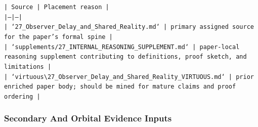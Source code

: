 \documentclass[11pt]{article}
\begin{document}
\noindent\texttt{| Source | Placement reason |}\\
\noindent\texttt{|---|---|}\\
\noindent\texttt{| `27\_Observer\_Delay\_and\_Shared\_Reality.md` | primary assigned source for the paper's formal spine |}\\
\noindent\texttt{| `supplements/27\_INTERNAL\_REASONING\_SUPPLEMENT.md` | paper-local reasoning supplement contributing to definitions, proof sketch, and limitations |}\\
\noindent\texttt{| `virtuous\textbackslash{}27\_Observer\_Delay\_and\_Shared\_Reality\_VIRTUOUS.md` | prior enriched paper body; should be mined for mature claims and proof ordering |}\\

\subsubsection*{Secondary And Orbital Evidence Inputs}
\end{document}
